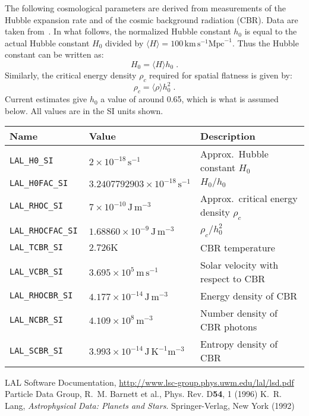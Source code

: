 \documentclass[10pt]{ligodcc}
\begin{document}
The following cosmological parameters are derived from measurements of
the Hubble expansion rate and of the cosmic background radiation
(CBR).  Data are taken from~\cite{Barnet:1996}.  In what follows, the
normalized Hubble constant $h_0$ is equal to the actual Hubble
constant $H_0$ divided by $\langle H
\rangle=100\,\mathrm{km}\,\mathrm{s}^{-1}\mathrm{Mpc}^{-1}$.  Thus the
Hubble constant can be written as:
$$
H_0 = \langle H \rangle h_0 \; .
$$
Similarly, the critical energy density $\rho_c$ required for spatial
flatness is given by:
$$
\rho_c = \langle\rho\rangle h_0^2 \; .
$$
Current estimates give $h_0$ a value of around 0.65, which is what is
assumed below.  All values are in the SI units shown.

\begin{center}
\begin{tabular}{|lll|}
\hline
Name & Value & Description \\
\hline
\tt LAL\_H0\_SI      & $2\times10^{-18}\,\mathrm{s}^{-1}$ &
        Approx.\ Hubble constant $H_0$ \\
\tt LAL\_H0FAC\_SI   & $3.2407792903\times10^{-18}\,\mathrm{s}^{-1}$ &
        $H_0/h_0$ \\
\tt LAL\_RHOC\_SI    & $7\times10^{-10}\,\mathrm{J}\,\mathrm{m}^{-3}$ &
        Approx.\ critical energy density $\rho_c$ \\
\tt LAL\_RHOCFAC\_SI & $1.68860\times10^{-9}\,\mathrm{J}\,\mathrm{m}^{-3}$ &
        $\rho_c/h_0^2$ \\
\tt LAL\_TCBR\_SI    & $2.726 \mathrm{K}$ &
        CBR temperature \\
\tt LAL\_VCBR\_SI    & $3.695\times10^5\,\mathrm{m}\,\mathrm{s}^{-1}$ &
        Solar velocity with respect to CBR \\
\tt LAL\_RHOCBR\_SI  & $4.177\times10^{-14}\,\mathrm{J}\,\mathrm{m}^{-3}$ &
        Energy density of CBR \\
\tt LAL\_NCBR\_SI    & $4.109\times10^8\,\mathrm{m}^{-3}$ &
        Number density of CBR photons \\
\tt LAL\_SCBR\_SI    & $3.993\times10^{-14}\,\mathrm{J}\,\mathrm{K}^{-1}
        \mathrm{m}^{-3}$ & Entropy density of CBR \\
\hline
\end{tabular}
\end{center}

\newpage\begin{thebibliography}{0}
  LAL Software Documentation,
  \url{http://www.lsc-group.phys.uwm.edu/lal/lsd.pdf}
  Particle Data Group, R.~M. Barnett et al., Phys. Rev. D\textbf{54},
  1 (1996)
  K.~R. Lang, \textit{Astrophysical Data: Planets and Stars}.
  Springer-Verlag, New York (1992)
\end{thebibliography}
\end{document}
